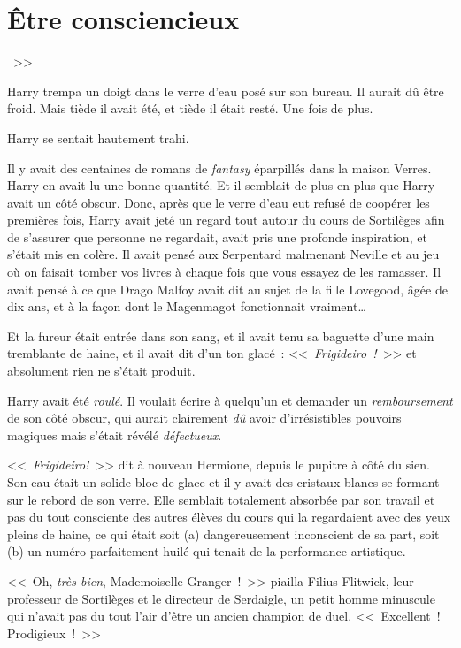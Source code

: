 \chapter{Être consciencieux}

~>>

\hplettrineextrapara
Harry trempa un doigt dans le verre d'eau posé sur son bureau. Il aurait dû être froid. Mais tiède il avait été, et tiède il était resté. Une fois de plus.

Harry se sentait hautement trahi.

Il y avait des centaines de romans de \emph{fantasy} éparpillés dans la maison Verres. Harry en avait lu une bonne quantité. Et il semblait de plus en plus que Harry avait un côté obscur. Donc, après que le verre d'eau eut refusé de coopérer les premières fois, Harry avait jeté un regard tout autour du cours de Sortilèges afin de s'assurer que personne ne regardait, avait pris une profonde inspiration, et s'était mis en colère. Il avait pensé aux Serpentard malmenant Neville et au jeu où on faisait tomber vos livres à chaque fois que vous essayez de les ramasser. Il avait pensé à ce que Drago Malfoy avait dit au sujet de la fille Lovegood, âgée de dix ans, et à la façon dont le Magenmagot fonctionnait vraiment…

Et la fureur était entrée dans son sang, et il avait tenu sa baguette d'une main tremblante de haine, et il avait dit d'un ton glacé~: <<~\emph{Frigideiro~!}~>> et absolument rien ne s'était produit.

Harry avait été \emph{roulé}. Il voulait écrire à quelqu'un et demander un \emph{remboursement} de son côté obscur, qui aurait clairement \emph{dû} avoir d'irrésistibles pouvoirs magiques mais s'était révélé \emph{défectueux}.

<<~\emph{Frigideiro!}~>> dit à nouveau Hermione, depuis le pupitre à côté du sien. Son eau était un solide bloc de glace et il y avait des cristaux blancs se formant sur le rebord de son verre. Elle semblait totalement absorbée par son travail et pas du tout consciente des autres élèves du cours qui la regardaient avec des yeux pleins de haine, ce qui était soit (a) dangereusement inconscient de sa part, soit (b) un numéro parfaitement huilé qui tenait de la performance artistique.

<<~Oh, \emph{très bien}, Mademoiselle Granger~!~>> piailla Filius Flitwick, leur professeur de Sortilèges et le directeur de Serdaigle, un petit homme minuscule qui n'avait pas du tout l'air d'être un ancien champion de duel. <<~Excellent~! Prodigieux~!~>>

